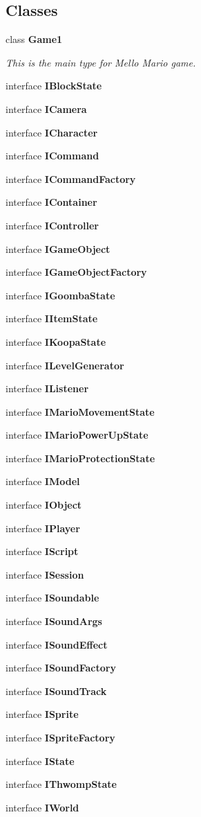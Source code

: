 \subsection*{Classes}
\begin{DoxyCompactItemize}
\item 
class \textbf{ Game1}
\begin{DoxyCompactList}\small\item\em This is the main type for Mello Mario game. \end{DoxyCompactList}\item 
interface \textbf{ I\+Block\+State}
\item 
interface \textbf{ I\+Camera}
\item 
interface \textbf{ I\+Character}
\item 
interface \textbf{ I\+Command}
\item 
interface \textbf{ I\+Command\+Factory}
\item 
interface \textbf{ I\+Container}
\item 
interface \textbf{ I\+Controller}
\item 
interface \textbf{ I\+Game\+Object}
\item 
interface \textbf{ I\+Game\+Object\+Factory}
\item 
interface \textbf{ I\+Goomba\+State}
\item 
interface \textbf{ I\+Item\+State}
\item 
interface \textbf{ I\+Koopa\+State}
\item 
interface \textbf{ I\+Level\+Generator}
\item 
interface \textbf{ I\+Listener}
\item 
interface \textbf{ I\+Mario\+Movement\+State}
\item 
interface \textbf{ I\+Mario\+Power\+Up\+State}
\item 
interface \textbf{ I\+Mario\+Protection\+State}
\item 
interface \textbf{ I\+Model}
\item 
interface \textbf{ I\+Object}
\item 
interface \textbf{ I\+Player}
\item 
interface \textbf{ I\+Script}
\item 
interface \textbf{ I\+Session}
\item 
interface \textbf{ I\+Soundable}
\item 
interface \textbf{ I\+Sound\+Args}
\item 
interface \textbf{ I\+Sound\+Effect}
\item 
interface \textbf{ I\+Sound\+Factory}
\item 
interface \textbf{ I\+Sound\+Track}
\item 
interface \textbf{ I\+Sprite}
\item 
interface \textbf{ I\+Sprite\+Factory}
\item 
interface \textbf{ I\+State}
\item 
interface \textbf{ I\+Thwomp\+State}
\item 
interface \textbf{ I\+World}
\end{DoxyCompactItemize}
